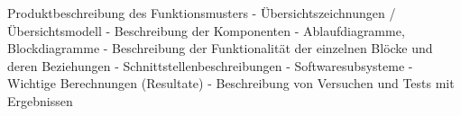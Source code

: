\documentclass[../../main.tex]{subfiles}
\begin{document}
Produktbeschreibung des Funktionsmusters
- Übersichtszeichnungen / Übersichtsmodell
- Beschreibung der Komponenten
- Ablaufdiagramme, Blockdiagramme
- Beschreibung der Funktionalität der einzelnen Blöcke und deren Beziehungen
- Schnittstellenbeschreibungen
- Softwaresubsysteme
- Wichtige Berechnungen (Resultate)
- Beschreibung von Versuchen und Tests mit Ergebnissen 

\begin{Huge} 
    \textbf{\color{red}{TODO: Übersichtskapitel Produktbeschreibung}}
\end{Huge}
\end{document}
